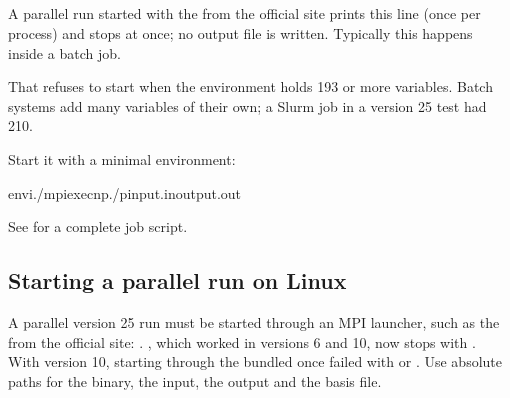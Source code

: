 \documentclass[letterpaper,10pt,english,openany,oneside]{sphinxmanual}
\begin{document}
\subsection{}
\label{\detokenize{troubleshooting/common-problems:environment-is-too-large-max-is-193}}
\sphinxAtStartPar
{} A parallel run started with the  from the official site prints this line (once per process)
and stops at once; no output file is written. Typically this happens inside a batch job.

\sphinxAtStartPar
{} That  refuses to start when the environment holds 193 or more variables. Batch systems add many
variables of their own; a Slurm job in a version 25 test had 210.

\sphinxAtStartPar
{} Start it with a minimal environment:

\begin{sphinxVerbatim}[commandchars=\\\{\}]
env\PYGZhy{}i./mpiexec\PYGZhy{}np./pinput.inoutput.out
\end{sphinxVerbatim}

\sphinxAtStartPar
See {\hyperref[\detokenize{start/parallel:running-batch}]{}} for a complete job script.




\subsection{Starting a parallel run on Linux}
\label{\detokenize{troubleshooting/common-problems:starting-a-parallel-run-on-linux}}
\sphinxAtStartPar
A parallel version 25 run must be started through an MPI launcher, such as the  from the official site:
. , which worked in versions 6 and 10, now stops with
. With version 10, starting through the bundled  once failed with
 or . Use absolute paths for the
binary, the input, the output and the basis file.
\end{document}

